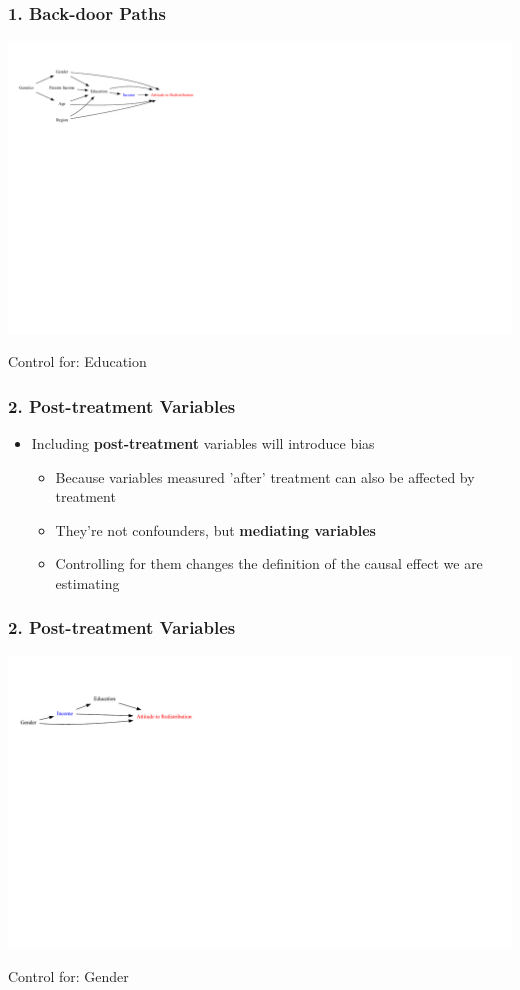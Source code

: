 \documentclass[xcolor=x11names,compress]{beamer}\usepackage[]{graphicx}\usepackage[]{color}
\newenvironment{knitrout}{}{} %
\renewcommand{\(}{\begin{columns}}
\renewcommand{\)}{\end{columns}}
\newcommand{\<}[1]{\begin{column}{#1}}
\renewcommand{\>}{\end{column}}
\begin{document}
\begin{frame}
\frametitle{1. Back-door Paths}
\begin{knitrout}
\color{fgcolor}
\includegraphics[width=2.7\linewidth]{figure/Dag4_paths_c-1} 

\end{knitrout}
\pause
Control for: Education
\end{frame}

\begin{frame}
\frametitle{2. Post-treatment Variables}
\begin{itemize}
\item Including \textbf{post-treatment} variables will introduce bias
\pause
\begin{itemize}
\item Because variables measured 'after' treatment can also be affected by treatment
\pause
\item They're not confounders, but \textbf{mediating variables}
\pause
\item Controlling for them changes the definition of the causal effect we are estimating
\end{itemize}
\end{itemize}
\end{frame}

\begin{frame}
\frametitle{2. Post-treatment Variables}
\begin{knitrout}
\color{fgcolor}
\includegraphics[width=2.7\linewidth]{figure/Dag4-1} 

\end{knitrout}
\pause
Control for: Gender
\end{frame}
\end{document}
